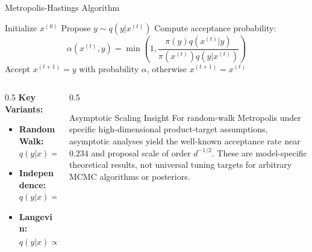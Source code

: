 \documentclass[aspectratio=169,11pt]{beamer}
\begin{document}
\begin{frame}{Metropolis-Hastings Algorithm}
\begin{algorithm}[H]
\caption{Metropolis-Hastings}
\begin{algorithmic}[1]
\STATE Initialize $x^{(0)}$
\STATE Propose $y \sim q(y | x^{(t)})$
\STATE Compute acceptance probability:
\[
\alpha(x^{(t)}, y) = \min\left(1, \frac{\pi(y) q(x^{(t)} | y)}{\pi(x^{(t)}) q(y | x^{(t)})}\right)
\]
\STATE Accept $x^{(t+1)} = y$ with probability $\alpha$, otherwise $x^{(t+1)} = x^{(t)}$
\ENDFOR
\end{algorithmic}
\end{algorithm}

\begin{columns}
\begin{column}{0.5\textwidth}
\textbf{Key Variants:}
\begin{itemize}
\item \textbf{Random Walk:} $q(y|x) = q(y-x)$
\item \textbf{Independence:} $q(y|x) = q(y)$
\item \textbf{Langevin:} $q(y|x) \propto \exp(-\|y-x-\frac{\epsilon^2}{2}\nabla\log\pi(x)\|^2/(2\epsilon^2))$
\end{itemize}
\end{column}
\begin{column}{0.5\textwidth}
\begin{block}{Asymptotic Scaling Insight}
For random-walk Metropolis under specific high-dimensional product-target assumptions, asymptotic analyses yield the well-known acceptance rate near $0.234$ and proposal scale of order $d^{-1/2}$. These are model-specific theoretical results, not universal tuning targets for arbitrary MCMC algorithms or posteriors.
\end{block}
\end{column}
\end{columns}
\end{frame}
\end{document}
